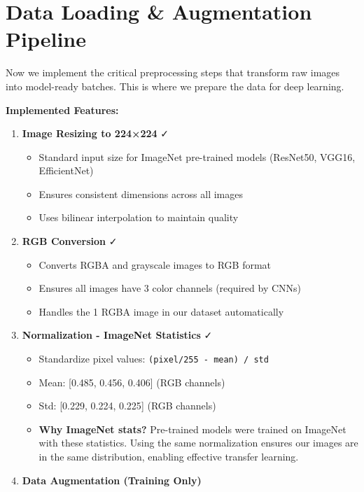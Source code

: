 \documentclass[
  letterpaper,
  DIV=11,
  numbers=noendperiod]{scrartcl}
\providecommand{\tightlist}{%
  \setlength{\itemsep}{0pt}\setlength{\parskip}{0pt}}
\begin{document}
\section{Data Loading \& Augmentation
Pipeline}\label{data-loading-augmentation-pipeline}

Now we implement the critical preprocessing steps that transform raw
images into model-ready batches. This is where we prepare the data for
deep learning.

\textbf{Implemented Features:}

\begin{enumerate}
\def\labelenumi{\arabic{enumi}.}
\item
  \textbf{Image Resizing to 224×224} ✓

  \begin{itemize}
  \tightlist
  \item
    Standard input size for ImageNet pre-trained models (ResNet50,
    VGG16, EfficientNet)
  \item
    Ensures consistent dimensions across all images
  \item
    Uses bilinear interpolation to maintain quality
  \end{itemize}
\item
  \textbf{RGB Conversion} ✓

  \begin{itemize}
  \tightlist
  \item
    Converts RGBA and grayscale images to RGB format
  \item
    Ensures all images have 3 color channels (required by CNNs)
  \item
    Handles the 1 RGBA image in our dataset automatically
  \end{itemize}
\item
  \textbf{Normalization - ImageNet Statistics} ✓

  \begin{itemize}
  \tightlist
  \item
    Standardize pixel values: \texttt{(pixel/255\ -\ mean)\ /\ std}
  \item
    Mean: {[}0.485, 0.456, 0.406{]} (RGB channels)
  \item
    Std: {[}0.229, 0.224, 0.225{]} (RGB channels)
  \item
    \textbf{Why ImageNet stats?} Pre-trained models were trained on
    ImageNet with these statistics. Using the same normalization ensures
    our images are in the same distribution, enabling effective transfer
    learning.
  \end{itemize}
\item
  \textbf{Data Augmentation (Training Only)}


\end{enumerate}
\end{document}
